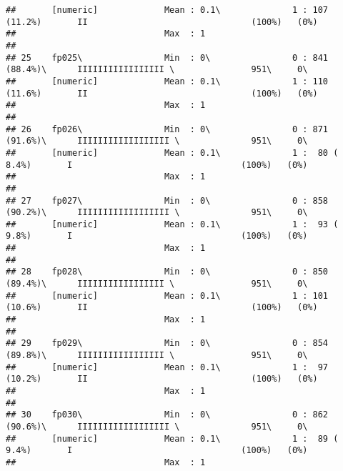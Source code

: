 \documentclass[]{article}
\begin{document}
\begin{verbatim}
##       [numeric]             Mean : 0.1\              1 : 107 (11.2%)       II                                (100%)   (0%)     
##                             Max  : 1                                                                                           
## 
## 25    fp025\                Min  : 0\                0 : 841 (88.4%)\      IIIIIIIIIIIIIIIII \               951\     0\       
##       [numeric]             Mean : 0.1\              1 : 110 (11.6%)       II                                (100%)   (0%)     
##                             Max  : 1                                                                                           
## 
## 26    fp026\                Min  : 0\                0 : 871 (91.6%)\      IIIIIIIIIIIIIIIIII \              951\     0\       
##       [numeric]             Mean : 0.1\              1 :  80 ( 8.4%)       I                                 (100%)   (0%)     
##                             Max  : 1                                                                                           
## 
## 27    fp027\                Min  : 0\                0 : 858 (90.2%)\      IIIIIIIIIIIIIIIIII \              951\     0\       
##       [numeric]             Mean : 0.1\              1 :  93 ( 9.8%)       I                                 (100%)   (0%)     
##                             Max  : 1                                                                                           
## 
## 28    fp028\                Min  : 0\                0 : 850 (89.4%)\      IIIIIIIIIIIIIIIII \               951\     0\       
##       [numeric]             Mean : 0.1\              1 : 101 (10.6%)       II                                (100%)   (0%)     
##                             Max  : 1                                                                                           
## 
## 29    fp029\                Min  : 0\                0 : 854 (89.8%)\      IIIIIIIIIIIIIIIII \               951\     0\       
##       [numeric]             Mean : 0.1\              1 :  97 (10.2%)       II                                (100%)   (0%)     
##                             Max  : 1                                                                                           
## 
## 30    fp030\                Min  : 0\                0 : 862 (90.6%)\      IIIIIIIIIIIIIIIIII \              951\     0\       
##       [numeric]             Mean : 0.1\              1 :  89 ( 9.4%)       I                                 (100%)   (0%)     
##                             Max  : 1                                                                                           

\end{verbatim}
\end{document}
